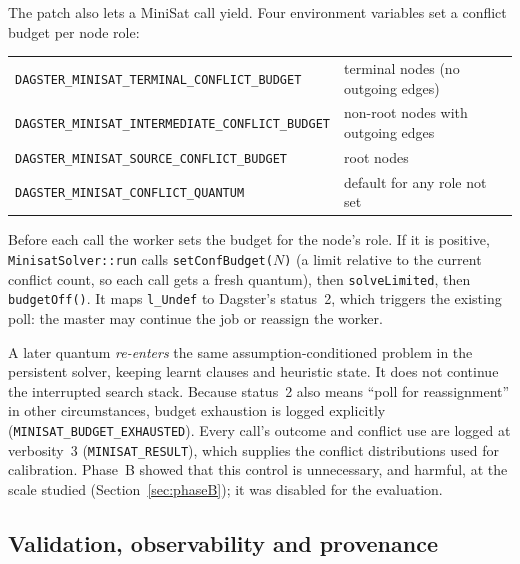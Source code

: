 \documentclass[11pt,a4paper]{article}
\begin{document}
The patch also lets a MiniSat call yield. Four environment variables set a conflict budget per node
role:
\begin{center}\footnotesize
\begin{tabular}{@{}ll@{}}
\toprule
\texttt{DAGSTER\_MINISAT\_TERMINAL\_CONFLICT\_BUDGET} & terminal nodes (no outgoing edges)\\
\texttt{DAGSTER\_MINISAT\_INTERMEDIATE\_CONFLICT\_BUDGET} & non-root nodes with outgoing edges\\
\texttt{DAGSTER\_MINISAT\_SOURCE\_CONFLICT\_BUDGET} & root nodes\\
\texttt{DAGSTER\_MINISAT\_CONFLICT\_QUANTUM} & default for any role not set\\
\bottomrule
\end{tabular}
\end{center}
Before each call the worker sets the budget for the node's role. If it is positive,
\texttt{MinisatSolver::run} calls \texttt{setConfBudget($N$)} (a limit relative to the current
conflict count, so each call gets a fresh quantum), then \texttt{solveLimited}, then
\texttt{budgetOff()}. It maps \texttt{l\_Undef} to Dagster's status~2, which triggers the existing
poll: the master may continue the job or reassign the worker.

A later quantum \emph{re-enters} the same assumption-conditioned problem in the persistent solver,
keeping learnt clauses and heuristic state. It does not continue the interrupted search stack.
Because status~2 also means ``poll for reassignment'' in other circumstances, budget exhaustion is
logged explicitly (\texttt{MINISAT\_BUDGET\_EXHAUSTED}). Every call's outcome and conflict use are
logged at verbosity~3 (\texttt{MINISAT\_RESULT}), which supplies the conflict distributions used for
calibration. Phase~B showed that this control is unnecessary, and harmful, at the scale studied
(Section~\ref{sec:phaseB}); it was disabled for the evaluation.

\subsection{Validation, observability and provenance}
\end{document}

